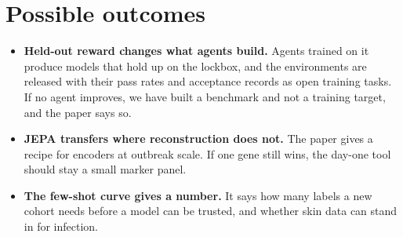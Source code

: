 \documentclass[11pt]{article}
\begin{document}
\section*{Possible outcomes}
\begin{itemize}
\item \textbf{Held-out reward changes what agents build.} Agents trained on it produce models that hold up on the lockbox, and the environments are released with their pass rates and acceptance records as open training tasks. If no agent improves, we have built a benchmark and not a training target, and the paper says so.
\item \textbf{JEPA transfers where reconstruction does not.} The paper gives a recipe for encoders at outbreak scale. If one gene still wins, the day-one tool should stay a small marker panel.
\item \textbf{The few-shot curve gives a number.} It says how many labels a new cohort needs before a model can be trusted, and whether skin data can stand in for infection.
\end{itemize}
\end{document}
